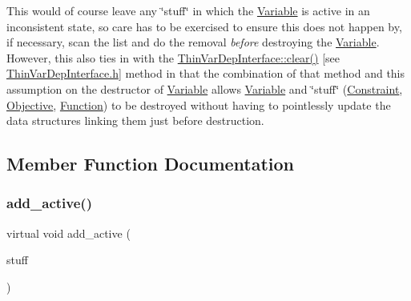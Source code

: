 This would of course leave any \char`\"{}stuff\char`\"{} in which the \mbox{\hyperlink{class_s_m_spp__di__unipi__it_1_1_variable}{Variable}} is active in an inconsistent state, so care has to be exercised to ensure this does not happen by, if necessary, scan the list and do the removal {\itshape before} destroying the \mbox{\hyperlink{class_s_m_spp__di__unipi__it_1_1_variable}{Variable}}. However, this also ties in with the \mbox{\hyperlink{group___thin_var_dep_interface___c_l_a_s_s_e_s_gae16067de85b435fac4ce8558b193a99a}{Thin\+Var\+Dep\+Interface\+::clear()}} \mbox{[}see \mbox{\hyperlink{_thin_var_dep_interface_8h}{Thin\+Var\+Dep\+Interface.\+h}}\mbox{]} method in that the combination of that method and this assumption on the destructor of \mbox{\hyperlink{class_s_m_spp__di__unipi__it_1_1_variable}{Variable}} allows \mbox{\hyperlink{class_s_m_spp__di__unipi__it_1_1_variable}{Variable}} and \char`\"{}stuff\char`\"{} (\mbox{\hyperlink{class_s_m_spp__di__unipi__it_1_1_constraint}{Constraint}}, \mbox{\hyperlink{class_s_m_spp__di__unipi__it_1_1_objective}{Objective}}, \mbox{\hyperlink{class_s_m_spp__di__unipi__it_1_1_function}{Function}}) to be destroyed without having to pointlessly update the data structures linking them just before destruction. 

\subsection{Member Function Documentation}
\mbox{\label{class_s_m_spp__di__unipi__it_1_1_variable_a0561f82eb0acc7697ef2da4375ca8030}} 
\subsubsection{\texorpdfstring{add\+\_\+active()}{add\_active()}}
{\footnotesize\ttfamily virtual void add\+\_\+active (\begin{DoxyParamCaption}\item[{\mbox{\hyperlink{class_s_m_spp__di__unipi__it_1_1_thin_var_dep_interface}{Thin\+Var\+Dep\+Interface}} $\ast$}]{stuff }\end{DoxyParamCaption})\hspace{0.3cm}{\ttfamily [pure virtual]}}



